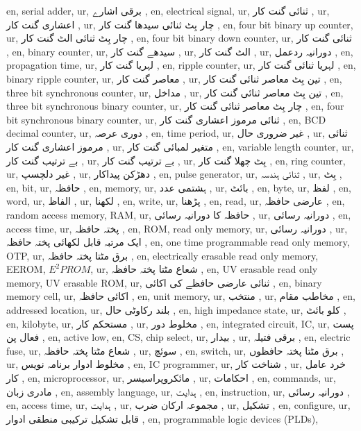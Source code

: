en, serial adder,
ur,  برقی اشارے  ,
en, electrical signal,
ur,  ثنائی گنت کار  ,
ur,  اعشاری گنت کار  ,
ur,  چار بِٹ ثنائی سیدھا گنت کار  ,
en, four bit binary up counter,
ur,  چار بِٹ ثنائی الٹ گنت کار  ,
en, four bit binary down counter,
ur, ثنائی گنت کار  ,
en, binary counter,
ur, سیدھے گنت کار  ,
ur, الٹ گنت کار  ,
ur,  دورانیہ ردعمل  ,
en, propagation time,
ur,  لہریا گنت کار  ,
en, ripple counter,
ur,  لہریا ثنائی گنت کار  ,
en, binary ripple counter,
ur, معاصر گنت کار  ,
ur, تین بِٹ معاصر ثنائی گنت کار  ,
en, three bit synchronous counter,
ur, مداخل  ,
ur,  تین بِٹ معاصر ثنائی گنت کار  ,
en, three bit synchronous binary counter,
ur,  چار بِٹ معاصر ثنائی گنت کار  ,
en, four bit synchronous binary counter,
ur, ثنائی مرموز اعشاری گنت کار ,
en, BCD decimal counter,
ur,  دوری عرصہ  ,
en, time period,
ur,  غیر ضروری حال  ,
ur, ثنائی مرموز اعشاری گنت کار  ,
ur, متغیر لمبائی گنت کار ,
en, variable length counter,
ur, بے ترتیب گنت کار  ,
ur,  بے ترتیب گنت کار  ,
ur, بِٹ چھلا گنت کار ,
en, ring counter,
ur,  غیر دلچسپ  ,
ur,  دھڑکن پیداکار  ,
en, pulse generator,
ur,  ثنائی ہندسہ  ,
ur, بِٹ  ,
en, bit,
ur, حافظہ  ,
en, memory,
ur,  ہشتمی عدد  ,
ur,  بائٹ  ,
en, byte,
ur,  لفظ  ,
en, word,
ur,  الفاظ  ,
ur,  لکھنا  ,
en, write,
ur,  پڑھنا  ,
en, read,
ur, عارضی حافظہ  ,
en, random access memory, RAM,
ur,  حافظہ کا دورانیہ رسائی  ,
ur,  دورانیہ رسائی  ,
en, access time,
ur,  پختہ حافظہ  ,
en, ROM, read only memory,
ur,  دورانیہ رسائی  ,
ur, ایک مرتبہ قابل لکھائی پختہ حافظہ  ,
en, one time programmable read only memory, OTP,
ur, برق مٹتا پختہ حافظہ  ,
en, electrically erasable read only memory, EEROM, \(E^2PROM\),
ur,  شعاع مٹتا پختہ حافظہ  ,
en, UV erasable read only memory, UV erasable ROM,
ur,  ثنائی عارضی حافظے کی اکائی  ,
en, binary memory cell,
ur,  اکائی حافظہ  ,
en, unit memory,
ur,  منتخب ,
ur,  مخاطب مقام  ,
en, addressed location,
ur, بلند رکاوٹی حال  ,
en, high impedance state,
ur, کلو بائٹ  ,
en, kilobyte,
ur,  مستحکم کار  ,
ur,  مخلوط دور  ,
en, integrated circuit, IC,
ur,  پست فعال پن  ,
en, active low,
en, CS, chip select,
ur,  بیدار  ,
ur,  برقی فتیلہ  ,
en, electric fuse,
ur, شعاع مٹتا پختہ حافظہ  ,
ur,  سوئچ  ,
en, switch,
ur,  برق مٹتا پختہ حافظوں  ,
ur,  مخلوط ادوار برنامہ نویس  ,
en, IC programmer,
ur, شناخت کار  ,
ur, خرد عامل کار ,
en, microprocessor,
ur, مائکروپراسیسر  ,
ur,  احکامات  ,
en, commands,
ur,  مادری زبان ,
en, assembly language,
ur,  ہدایت  ,
en, instruction,
ur, دورانیہ رسائی  ,
en, access time,
ur,  ہدایت  ,
ur,  مجموعہ ارکان ضرب ,
ur,  تشکیل  ,
en, configure,
ur,  قابل تشکیل ترکیبی منطقی ادوار  ,
en, programmable logic devices (PLDs),
